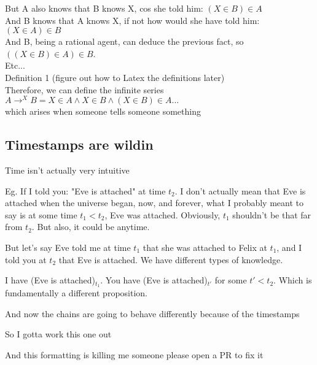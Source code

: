 \documentclass[12pt,a4paper]{article}
\begin{document}
But A also knows that B knows X, cos she told him: $(X \in B) \in A$ \\

And B knows that A knows X, if not how would she have told him: $(X \in A) \in B$ \\

And B, being a rational agent, can deduce the previous fact, so $((X \in B) \in A) \in B$. \\

Etc... \\

Definition 1 (figure out how to Latex the definitions later) \\

Therefore, we can define the infinite series $A \rightarrow^X B = X \in A \wedge X \in B \wedge (X \in B) \in A ...$ \\

which arises when someone tells someone something \\



\subsection{Timestamps are wildin}
Time isn't actually very intuitive

Eg. If I told you: "Eve is attached" at time $t_2$. I don't actually mean that Eve is attached when the universe began, now, and forever, what I probably meant to say is at some time $t_1 < t_2$, Eve was attached. Obviously, $t_1$ shouldn't be that far from $t_2$. But also, it could be anytime. 

But let's say Eve told me at time $t_1$ that she was attached to Felix at $t_1$, and I told you at $t_2$ that Eve is attached. We have different types of knowledge.

I have (Eve is attached)$_{t_1}$. You have (Eve is attached)$_{t'}$ for some $t' < t_2$. Which is fundamentally a different proposition.


And now the chains are going to behave differently because of the timestamps

So I gotta work this one out


And  this formatting is killing me someone please open a PR to fix it


	
\end{document}
